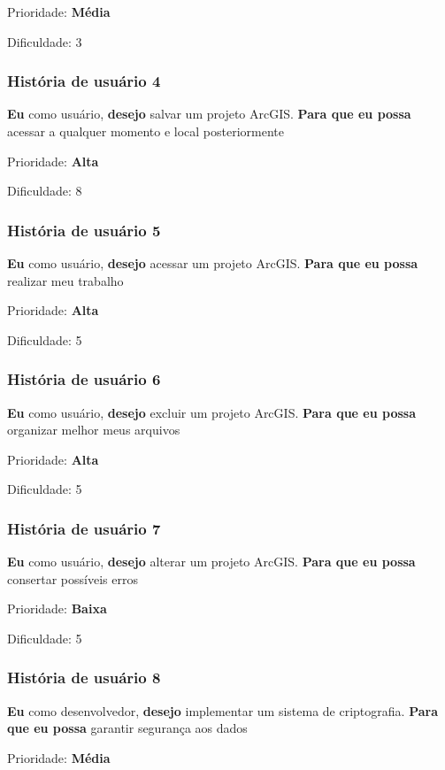     Prioridade: \textbf{Média}

    Dificuldade: 3

  \subsubsection{História de usuário 4}
    \textbf{Eu} como usuário, \textbf{desejo} salvar um projeto ArcGIS. \textbf{Para que eu possa} acessar a qualquer momento e local posteriormente

    Prioridade: \textbf{Alta}

    Dificuldade: 8

  \subsubsection{História de usuário 5}
    \textbf{Eu} como usuário, \textbf{desejo} acessar um projeto ArcGIS. \textbf{Para que eu possa} realizar meu trabalho

    Prioridade: \textbf{Alta}

    Dificuldade: 5

  \subsubsection{História de usuário 6}
    \textbf{Eu} como usuário, \textbf{desejo} excluir um projeto ArcGIS. \textbf{Para que eu possa} organizar melhor meus arquivos

    Prioridade: \textbf{Alta}

    Dificuldade: 5

  \subsubsection{História de usuário 7}
    \textbf{Eu} como usuário, \textbf{desejo} alterar um projeto ArcGIS. \textbf{Para que eu possa} consertar possíveis erros

    Prioridade: \textbf{Baixa}

    Dificuldade: 5

  \subsubsection{História de usuário 8}
    \textbf{Eu} como desenvolvedor, \textbf{desejo} implementar um sistema de criptografia. \textbf{Para que eu possa} garantir segurança aos dados

    Prioridade: \textbf{Média}

